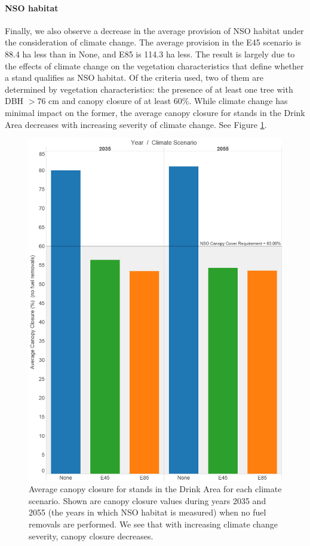 \paragraph{NSO habitat}
Finally, we also observe a decrease in the average provision of NSO habitat under the consideration of climate change. The average provision in the E45 scenario is 88.4 ha less than in None, and E85 is 114.3 ha less. The result is largely due to the effects of climate change on the vegetation characteristics that define whether a stand qualifies as NSO habitat. Of the criteria used, two of them are determined by vegetation characteristics: the presence of at least one tree with DBH $> 76$ cm and canopy closure of at least 60\%. While climate change has minimal impact on the former, the average canopy closure for stands in the Drink Area decreases with increasing severity of climate change. See Figure \ref{fig:canopyClosure}.

\begin{figure}[ht]
\centering
\includegraphics[width=.5\textwidth]{../images/AvgCanopyCover_NoTrtmts}
\caption[Average canopy closure in the Drink Area across climate scenarios]{Average canopy closure for stands in the Drink Area for each climate scenario. Shown are canopy closure values during years 2035 and 2055 (the years in which NSO habitat is measured) when no fuel removals are performed. We see that with increasing climate change severity, canopy closure decreases.}
\label{fig:canopyClosure}
\end{figure}

